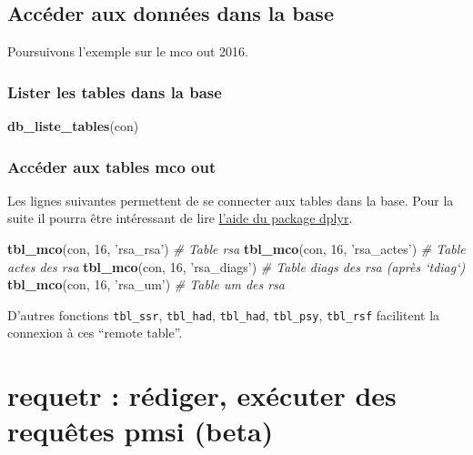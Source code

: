 \documentclass[]{book}
\newenvironment{Shaded}{\begin{snugshade}}{\end{snugshade}}
\newcommand{\KeywordTok}[1]{\textcolor[rgb]{0.13,0.29,0.53}{\textbf{#1}}}
\newcommand{\DecValTok}[1]{\textcolor[rgb]{0.00,0.00,0.81}{#1}}
\newcommand{\StringTok}[1]{\textcolor[rgb]{0.31,0.60,0.02}{#1}}
\newcommand{\CommentTok}[1]{\textcolor[rgb]{0.56,0.35,0.01}{\textit{#1}}}
\newcommand{\NormalTok}[1]{#1}
\theoremstyle{definition}
\theoremstyle{definition}
\theoremstyle{definition}
\theoremstyle{remark}
\begin{document}
\section{Accéder aux données dans la
base}\label{acceder-aux-donnees-dans-la-base}

Poursuivons l'exemple sur le mco out 2016.

\subsection{Lister les tables dans la
base}\label{lister-les-tables-dans-la-base}

\begin{Shaded}
\begin{Highlighting}[]
\KeywordTok{db_liste_tables}\NormalTok{(con)}
\end{Highlighting}
\end{Shaded}

\subsection{Accéder aux tables mco
out}\label{acceder-aux-tables-mco-out}

Les lignes suivantes permettent de se connecter aux tables dans la base.
Pour la suite il pourra être intéressant de lire
\href{http://db.rstudio.com/dplyr/}{l'aide du package dplyr}.

\begin{Shaded}
\begin{Highlighting}[]
\KeywordTok{tbl_mco}\NormalTok{(con, }\DecValTok{16}\NormalTok{, }\StringTok{'rsa_rsa'}\NormalTok{) }\CommentTok{# Table rsa}
\KeywordTok{tbl_mco}\NormalTok{(con, }\DecValTok{16}\NormalTok{, }\StringTok{'rsa_actes'}\NormalTok{) }\CommentTok{# Table actes des rsa}
\KeywordTok{tbl_mco}\NormalTok{(con, }\DecValTok{16}\NormalTok{, }\StringTok{'rsa_diags'}\NormalTok{) }\CommentTok{# Table diags des rsa (après `tdiag`)}
\KeywordTok{tbl_mco}\NormalTok{(con, }\DecValTok{16}\NormalTok{, }\StringTok{'rsa_um'}\NormalTok{) }\CommentTok{# Table um des rsa }
\end{Highlighting}
\end{Shaded}

D'autres fonctions \texttt{tbl\_ssr}, \texttt{tbl\_had},
\texttt{tbl\_had}, \texttt{tbl\_psy}, \texttt{tbl\_rsf} facilitent la
connexion à ces ``remote table''.

\chapter{requetr : rédiger, exécuter des requêtes pmsi
(beta)}\label{requetr-rediger-executer-des-requetes-pmsi-beta}
\end{document}
